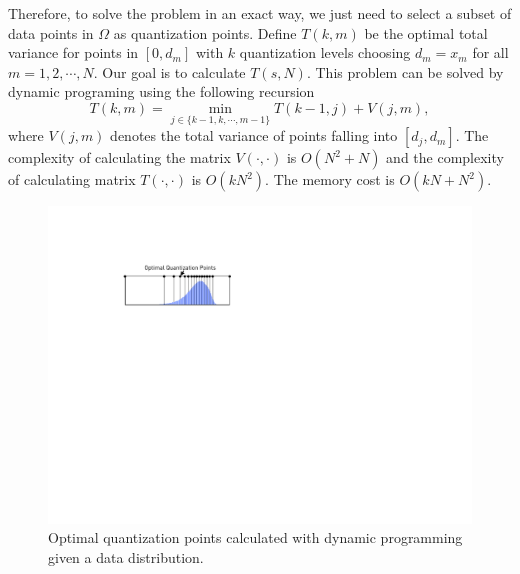\documentclass{article}
\newcommand{\err}{\ensuremath{\mathrm{err}}}
\newcommand{\setI}{\mathcal{I}}
\begin{document}

\vspace{-0.5em}
Therefore, to solve the problem in an exact way, we just need to select a subset of data points in $\Omega$ as quantization points. Define $T(k, m)$ be the optimal total variance for points in $[0, d_m]$ with $k$ quantization levels choosing $d_m=x_m$ for all $m=1,2,\cdots, N$. Our goal is to calculate $T(s, N)$. This problem can be solved by dynamic programing using the following recursion
\[
T(k, m) = \min_{j\in \{k-1, k, \cdots, m-1\}} T(k-1,j) + V(j,m),
\]
where $V(j,m)$ denotes the total variance of points falling into $[d_j, d_m]$. The complexity of calculating the matrix $V(\cdot, \cdot)$ is $O(N^2 + N)$ and the complexity of calculating matrix $T(\cdot, \cdot)$ is $O(kN^2)$. The memory cost is $O(kN + N^2)$. 

\begin{figure}[t]
\centering    
\includegraphics[width=0.5\columnwidth]{micro-experiments/dp-level.pdf} 
\vspace{-1em}
\caption{Optimal quantization points calculated with
dynamic programming given a data distribution. }
\vspace{-1em}
\label{fig:optimalquantization}
\end{figure} 
\end{document}

